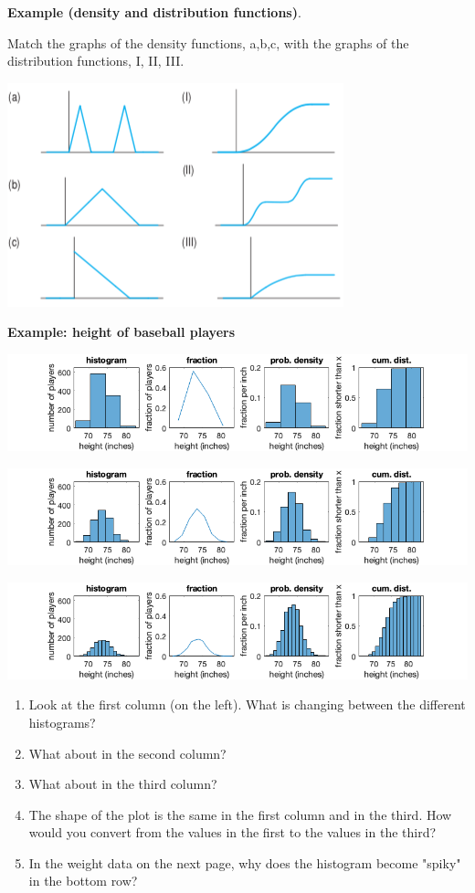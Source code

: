 \documentclass[12pt,letterpaper,noanswers]{exam}
\begin{document}


\noindent\textbf{Example (density and distribution functions)}. 

Match the graphs of the density functions, a,b,c, with the graphs of the distribution functions, I, II, III.  %

\includegraphics{img/C20p9.png}
\vfill

\eject

\noindent\textbf{Example: height of baseball players}

\includegraphics[width=\textwidth]{img/C14histbox4.png}

\includegraphics[width=\textwidth]{img/C14histbox2.png}

\includegraphics[width=\textwidth]{img/C14histbox1.png}


\begin{enumerate}
    \item Look at the first column (on the left).  What is changing between the different histograms? %
    \item What about in the second column?
    \item What about in the third column?
    \item The shape of the plot is the same in the first column and in the third.  How would you convert from the values in the first to the values in the third?
    \item In the weight data on the next page, why does the histogram become "spiky" in the bottom row?
\end{enumerate}
\end{document}
